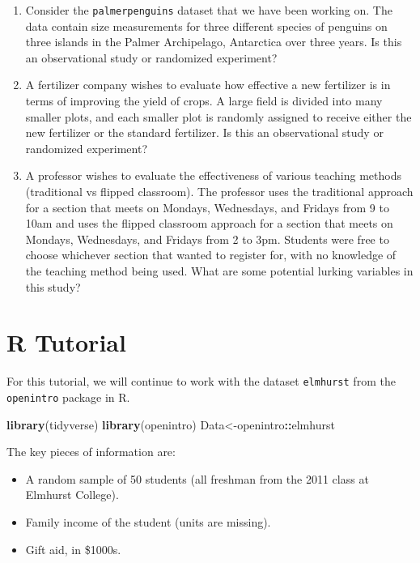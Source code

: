 \documentclass[
]{book}
\newenvironment{Shaded}{\begin{snugshade}}{\end{snugshade}}
\newcommand{\FunctionTok}[1]{\textcolor[rgb]{0.13,0.29,0.53}{\textbf{#1}}}
\newcommand{\NormalTok}[1]{#1}
\newcommand{\OtherTok}[1]{\textcolor[rgb]{0.56,0.35,0.01}{#1}}
\newcommand{\SpecialCharTok}[1]{\textcolor[rgb]{0.81,0.36,0.00}{\textbf{#1}}}
\providecommand{\tightlist}{%
  \setlength{\itemsep}{0pt}\setlength{\parskip}{0pt}}
\begin{document}
\begin{enumerate}
\def\labelenumi{\arabic{enumi}.}
\item
  Consider the \texttt{palmerpenguins} dataset that we have been working on. The data contain size measurements for three different species of penguins on three islands in the Palmer Archipelago, Antarctica over three years. Is this an observational study or randomized experiment?
\item
  A fertilizer company wishes to evaluate how effective a new fertilizer is in terms of improving the yield of crops. A large field is divided into many smaller plots, and each smaller plot is randomly assigned to receive either the new fertilizer or the standard fertilizer. Is this an observational study or randomized experiment?
\item
  A professor wishes to evaluate the effectiveness of various teaching methods (traditional vs flipped classroom). The professor uses the traditional approach for a section that meets on Mondays, Wednesdays, and Fridays from 9 to 10am and uses the flipped classroom approach for a section that meets on Mondays, Wednesdays, and Fridays from 2 to 3pm. Students were free to choose whichever section that wanted to register for, with no knowledge of the teaching method being used. What are some potential lurking variables in this study?
\end{enumerate}

\hypertarget{r-tutorial-1}{%
\section{R Tutorial}\label{r-tutorial-1}}

For this tutorial, we will continue to work with the dataset \texttt{elmhurst} from the \texttt{openintro} package in R.

\begin{Shaded}
\begin{Highlighting}[]
\FunctionTok{library}\NormalTok{(tidyverse)}
\FunctionTok{library}\NormalTok{(openintro)}
\NormalTok{Data}\OtherTok{\textless{}{-}}\NormalTok{openintro}\SpecialCharTok{::}\NormalTok{elmhurst}
\end{Highlighting}
\end{Shaded}

The key pieces of information are:

\begin{itemize}
\tightlist
\item
  A random sample of 50 students (all freshman from the 2011 class at Elmhurst College).
\item
  Family income of the student (units are missing).
\item
  Gift aid, in \$1000s.
\end{itemize}
\end{document}
